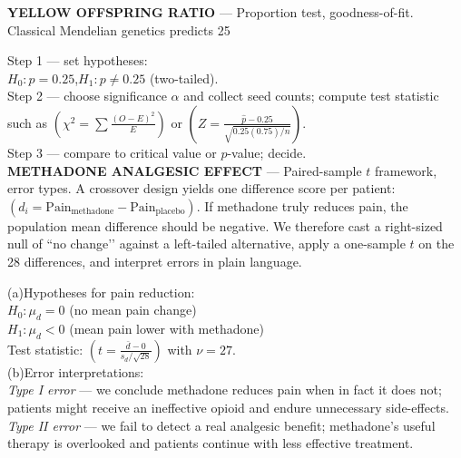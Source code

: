 \documentclass[landscape,0.4pt]{article}
\begin{document}
\begin{multicols*}{6}

\textbf{\tiny{YELLOW OFFSPRING RATIO}} — Proportion test, goodness-of-fit.  
Classical Mendelian genetics predicts 25 %

Step 1 — set hypotheses:\\
\hspace*{1em}$H_{0}:p=0.25$,\;\;$H_{1}:p\neq0.25$ (two-tailed).\\
Step 2 — choose significance $\alpha$ and collect seed counts; compute test statistic such as $(\chi^{2}=\sum\frac{(O-E)^{2}}{E})$ or $(Z=\frac{\hat{p}-0.25}{\sqrt{0.25(0.75)/n}})$.\\
Step 3 — compare to critical value or $p$-value; decide.\\[-2pt]


\textbf{\tiny{METHADONE ANALGESIC EFFECT}} — Paired-sample $t$ framework, error types.  
A crossover design yields one difference score per patient: $(d_i=\text{Pain}_{\text{methadone}}-\text{Pain}_{\text{placebo}})$.  If methadone truly reduces pain, the population mean difference should be negative.  We therefore cast a right-sized null of “no change’’ against a left-tailed alternative, apply a one-sample $t$ on the 28 differences, and interpret errors in plain language.

(a)\;Hypotheses for pain reduction:\\
\hspace*{1em}$H_{0}:\mu_{d}=0$ (no mean pain change)\\
\hspace*{1em}$H_{1}:\mu_{d}<0$ (mean pain lower with methadone)\\
\hspace*{1em}Test statistic: $(t=\frac{\bar{d}-0}{s_{d}/\sqrt{28}})$ with $\nu=27$.\\

(b)\;Error interpretations:\\
\hspace*{1em}\textit{Type I error} — we conclude methadone reduces pain when in fact it does not; patients might receive an ineffective opioid and endure unnecessary side-effects.\\
\hspace*{1em}\textit{Type II error} — we fail to detect a real analgesic benefit; methadone’s useful therapy is overlooked and patients continue with less effective treatment.\\[-2pt]


\end{multicols*}
\end{document}

